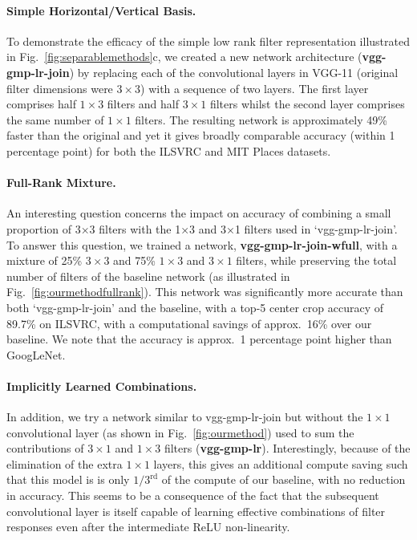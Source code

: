 \documentclass[thesis]{subfiles}
\begin{document}
    \paragraph{Simple Horizontal/Vertical Basis.} To demonstrate the efficacy of the simple low rank filter representation illustrated in Fig.~\ref{fig:separablemethods}c, we created a new network architecture (\textbf{vgg-gmp-lr-join}) by replacing each of the convolutional layers in VGG-11 (original filter dimensions were $3 \times 3$) with a sequence of two layers. The first layer comprises half $1\times 3$ filters and half $3\times 1$ filters whilst the second layer comprises the same number of $1\times 1$ filters. The resulting network is approximately 49\% faster than the original and yet it gives broadly comparable accuracy (within 1 percentage point) for both the ILSVRC and MIT Places datasets.
    
    \paragraph{Full-Rank Mixture.} An interesting question concerns the impact on accuracy of combining a small proportion of 3×3 filters with the 1×3 and 3×1 filters used in ‘vgg-gmp-lr-join’. To answer this question, we trained a network, \textbf{vgg-gmp-lr-join-wfull}, with a mixture of 25\% $3 \times 3$ and 75\% $1 \times 3$ and $3 \times 1$ filters, while preserving the total number of filters of the baseline network (as illustrated in Fig.~\ref{fig:ourmethodfullrank}). This network was significantly more accurate than both `vgg-gmp-lr-join' and the baseline, with a top-5 center crop accuracy of 89.7\% on ILSVRC, with a computational savings of approx.~16\% over our baseline. We note that the accuracy is approx.~1 percentage point higher than GoogLeNet.
    
    \paragraph{Implicitly Learned Combinations.} In addition, we try a network similar to vgg-gmp-lr-join but without the $1 \times 1$ convolutional layer (as shown in Fig.~\ref{fig:ourmethod}) used to sum the contributions of $3 \times 1$ and $1 \times 3$ filters (\textbf{vgg-gmp-lr}). Interestingly, because of the elimination of the extra $1\times 1$ layers, this gives an additional compute saving such that this model is is only $1/3^{\textrm{rd}}$ of the compute of our baseline, with no reduction in accuracy. This seems to be a consequence of the fact that the subsequent convolutional layer is itself capable of learning effective combinations of filter responses even after the intermediate ReLU non-linearity.
    
\end{document}
